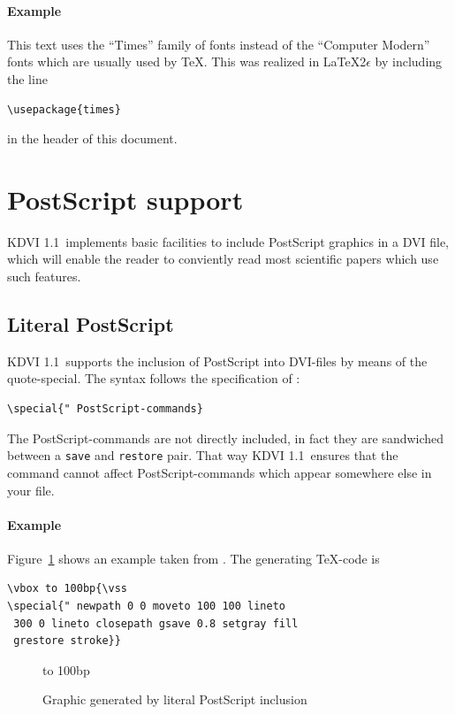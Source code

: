 \documentclass{article}
\newcommand{\KDVI}{{\sf KDVI 1.1}}
\begin{document}
\paragraph*{Example}

This text uses the ``Times'' family of fonts instead of the ``Computer
Modern'' fonts which are usually used by \TeX. This was realized in
\LaTeX 2$\epsilon$ by including the line
\begin{verbatim}
\usepackage{times} 
\end{verbatim}
in the header of this document.


\section{PostScript support}

\KDVI\ implements basic facilities to include PostScript graphics in a
DVI file, which will enable the reader to conviently read most
scientific papers which use such features. 

\subsection{Literal PostScript}

\KDVI\ supports the inclusion of PostScript into DVI-files by means of
the quote-special. The syntax follows the specification of
\cite{dvips}:
\begin{verbatim}
\special{" PostScript-commands}
\end{verbatim}
The PostScript-commands are not directly included, in fact they are
sandwiched between a {\tt save} and {\tt restore} pair. That way
\KDVI\ ensures that the command cannot affect PostScript-commands
which appear somewhere else in your file.

\paragraph*{Example}

Figure~\ref{quote-special} shows an example taken from \cite{dvips}.
The generating \TeX -code is
\begin{verbatim}
\vbox to 100bp{\vss
\special{" newpath 0 0 moveto 100 100 lineto
 300 0 lineto closepath gsave 0.8 setgray fill 
 grestore stroke}}
\end{verbatim}

\begin{figure}
\vbox to 100bp{\vss
{}}
\caption{Graphic generated by literal PostScript inclusion\label{quote-special}}
\end{figure}
\end{document}
